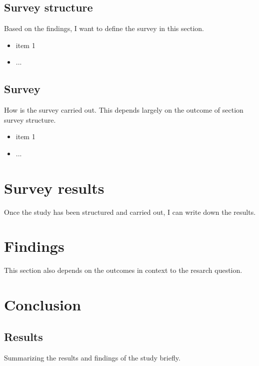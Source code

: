         \section{Survey structure}

            Based on the findings, I want to define the survey in this section.

            \begin{itemize}
                \item item 1
                \item ...
            \end{itemize}

        \section{Survey}

            How is the survey carried out. This depends largely on the outcome of section survey structure.

            \begin{itemize}
                \item item 1
                \item ...
            \end{itemize}

    \chapter{Survey results}

        Once the study has been structured and carried out, I can write down the results.

    \chapter{Findings}

        This section also depends on the outcomes in context to the resarch question.

    \chapter{Conclusion}

        \section{Results}

            Summarizing the results and findings of the study briefly.


